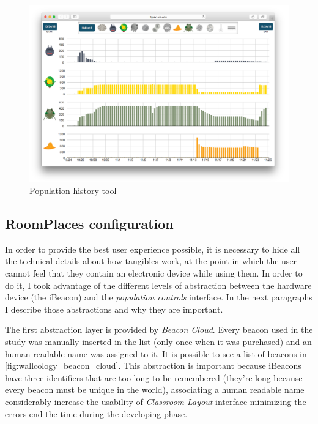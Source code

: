\begin{figure}
\centering
\includegraphics[width=4.5in]{images/population-history.png}
\caption{Population history tool}
\label{fig:population_history}
\end{figure}

\subsection{RoomPlaces configuration}
In order to provide the best user experience possible, it is necessary to hide all the technical details about how tangibles work, at the point in which the user cannot feel that they contain an electronic device while using them. In order to do it, I took advantage of the different levels of abstraction between the hardware device (the iBeacon) and the \textit{population controls} interface. In the next paragraphs I describe those abstractions and why they are important.

The first abstraction layer is provided by \textit{Beacon Cloud}. Every beacon used in the study was manually inserted in the list (only once when it was purchased) and an human readable name was assigned to it. It is possible to see a list of beacons in \ref{fig:wallcology_beacon_cloud}. This abstraction is important because iBeacons have three identifiers that are too long to be remembered (they're long because every beacon must be unique in the world), associating a human readable name considerably increase the usability of \textit{Classroom Layout} interface minimizing the errors end the time during the developing phase.

